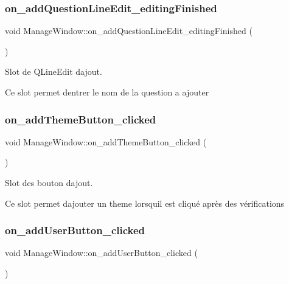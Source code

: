 \subsubsection{\texorpdfstring{on\+\_\+add\+Question\+Line\+Edit\+\_\+editing\+Finished}{on\_addQuestionLineEdit\_editingFinished}}
{\footnotesize\ttfamily void Manage\+Window\+::on\+\_\+add\+Question\+Line\+Edit\+\_\+editing\+Finished (\begin{DoxyParamCaption}{ }\end{DoxyParamCaption})\hspace{0.3cm}{\ttfamily [slot]}}



Slot de Q\+Line\+Edit d\textquotesingle{}ajout. 

Ce slot permet d\textquotesingle{}entrer le nom de la question a ajouter \mbox{\label{classManageWindow_a77d7f3c9d65fa3e1842778aa554c3d19}} 
\subsubsection{\texorpdfstring{on\+\_\+add\+Theme\+Button\+\_\+clicked}{on\_addThemeButton\_clicked}}
{\footnotesize\ttfamily void Manage\+Window\+::on\+\_\+add\+Theme\+Button\+\_\+clicked (\begin{DoxyParamCaption}{ }\end{DoxyParamCaption})\hspace{0.3cm}{\ttfamily [slot]}}



Slot des bouton d\textquotesingle{}ajout. 

Ce slot permet d\textquotesingle{}ajouter un theme lorsqu\textquotesingle{}il est cliqué après des vérifications \mbox{\label{classManageWindow_a741f69a15264a0b10767cc89522ecaf9}} 
\subsubsection{\texorpdfstring{on\+\_\+add\+User\+Button\+\_\+clicked}{on\_addUserButton\_clicked}}
{\footnotesize\ttfamily void Manage\+Window\+::on\+\_\+add\+User\+Button\+\_\+clicked (\begin{DoxyParamCaption}{ }\end{DoxyParamCaption})\hspace{0.3cm}{\ttfamily [slot]}}



